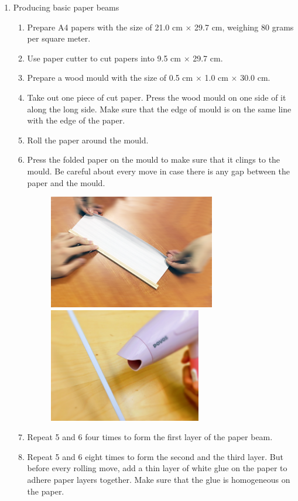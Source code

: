 \begin{enumerate}
\item Producing basic paper beams
	\begin{enumerate}
	\item Prepare A4 papers with the size of 21.0 cm $\times$ 29.7 cm, weighing 80 grams per square meter.
	\item Use paper cutter to cut papers into 9.5 cm $\times$ 29.7 cm.
	\item Prepare a wood mould with the size of 0.5 cm $\times$ 1.0 cm $\times$ 30.0 cm.
	\item Take out one piece of cut paper. Press the wood mould on one side of it along the long side. Make sure that the edge of mould is on the same line with the edge of the paper.
	\item Roll the paper around the mould. 
	\item Press the folded paper on the mould to make sure that it clings to the mould. Be careful about every move in case there is any gap between the paper and the mould.  
	\newpage
	\begin{figure}[H]
	\begin{center}
	\includegraphics[height=5cm]{figure/procedureJuanzhi/p1}
	\includegraphics[height=5cm]{figure/procedureJuanzhi/p4}
	\end{center}
	\end{figure}
	\item Repeat 5 and 6 four times to form the first layer of the paper beam.
	\item Repeat 5 and 6 eight times to form the second and the third layer. But before every rolling move, add a thin layer of white glue on the paper to adhere paper layers together. Make sure that the glue is homogeneous on the paper.

\end{enumerate}
\end{enumerate}
